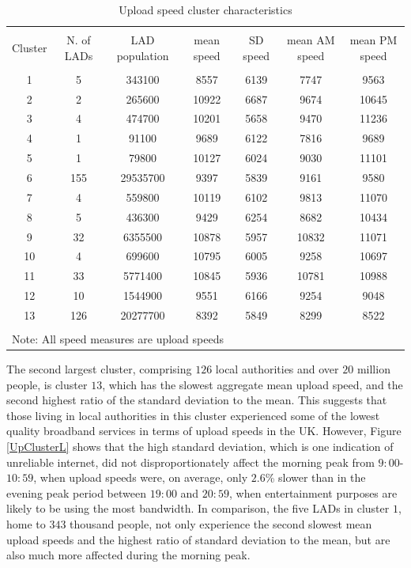 \documentclass[Royal,times,sageh]{sagej}
\begin{document}
\begin{table}[!htbp] \centering 
  \caption{Upload speed cluster characteristics\label{up.cluster.descr}} 
  \label{} 
\footnotesize 
\begin{tabular}{@{\extracolsep{0pt}} ccccccc} 
\\[-1.8ex]\hline 
\hline \\[-1.8ex] 
Cluster & N. of LADs & LAD population & mean speed & SD speed & mean AM speed & mean PM speed \\ 
\hline \\[-1.8ex] 
1 & 5 & 343100 & 8557 & 6139 & 7747 & 9563 \\ 
2 & 2 & 265600 & 10922 & 6687 & 9674 & 10645 \\ 
3 & 4 & 474700 & 10201 & 5658 & 9470 & 11236 \\ 
4 & 1 & 91100 & 9689 & 6122 & 7816 & 9689 \\ 
5 & 1 & 79800 & 10127 & 6024 & 9030 & 11101 \\ 
6 & 155 & 29535700 & 9397 & 5839 & 9161 & 9580 \\ 
7 & 4 & 559800 & 10119 & 6102 & 9813 & 11070 \\ 
8 & 5 & 436300 & 9429 & 6254 & 8682 & 10434 \\ 
9 & 32 & 6355500 & 10878 & 5957 & 10832 & 11071 \\ 
10 & 4 & 699600 & 10795 & 6005 & 9258 & 10697 \\ 
11 & 33 & 5771400 & 10845 & 5936 & 10781 & 10988 \\ 
12 & 10 & 1544900 & 9551 & 6166 & 9254 & 9048 \\ 
13 & 126 & 20277700 & 8392 & 5849 & 8299 & 8522 \\ 
\hline \\[-1.8ex] 
\multicolumn{7}{l}{Note: All speed measures are upload speeds} \\ 
\end{tabular} 
\end{table}

The second largest cluster, comprising \(126\) local authorities and
over \(20\) million people, is cluster \(13\), which has the slowest
aggregate mean upload speed, and the second highest ratio of the
standard deviation to the mean. This suggests that those living in local
authorities in this cluster experienced some of the lowest quality
broadband services in terms of upload speeds in the UK. However, Figure
\ref{UpClusterL} shows that the high standard deviation, which is one
indication of unreliable internet, did not disproportionately affect the
morning peak from \(9:00\)-\(10:59\), when upload speeds were, on
average, only \(2.6\)\% slower than in the evening peak period between
\(19:00\) and \(20:59\), when entertainment purposes are likely to be
using the most bandwidth. In comparison, the five LADs in cluster \(1\),
home to \(343\) thousand people, not only experience the second slowest
mean upload speeds and the highest ratio of standard deviation to the
mean, but are also much more affected during the morning peak.
\end{document}
